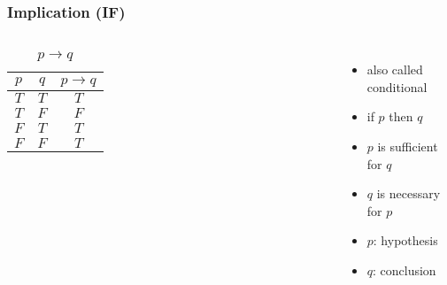 \documentclass[dvipsnames]{beamer}
\begin{document}
\begin{frame}
  \frametitle{Implication (IF)}

  \begin{columns}
    \begin{table}
      \caption{$p \rightarrow q$}
      \begin{tabular}{|c|c||c|}\hline
        $p$ & $q$ & $p \rightarrow q$\\\hline\hline
        $T$ & $T$ & $T$\\\hline
        $T$ & $F$ & $F$\\\hline
        $F$ & $T$ & $T$\\\hline
        $F$ & $F$ & $T$\\\hline
      \end{tabular}
    \end{table}

    \begin{itemize}
      \item also called \alert{conditional}
      \item if $p$ then $q$
      \smallskip
      \item $p$ is sufficient for $q$
      \item $q$ is necessary for $p$

      \medskip
      \item $p$: \alert{hypothesis}
      \item $q$: \alert{conclusion}
    \end{itemize}
  \end{columns}
\end{frame}
\end{document}
